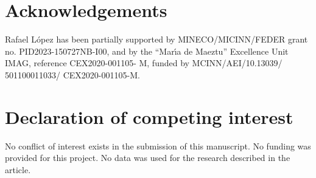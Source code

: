 \documentclass[a4paper,12pt]{amsart}
\theoremstyle{plain}
\theoremstyle{definition}
\begin{document}
 
 


\section*{Acknowledgements}
 Rafael L\'opez has been partially supported by MINECO/MICINN/FEDER grant no. PID2023-150727NB-I00, and by the ``Mar\'{\i}a de Maeztu'' Excellence Unit IMAG, reference CEX2020-001105- M, funded by MCINN/AEI/10.13039/ 501100011033/ CEX2020-001105-M.
 
\section*{Declaration of competing interest}
No conflict of interest exists in the submission of this manuscript. No
funding was provided for this project. No data was used for the research described in the article.

\end{document}
